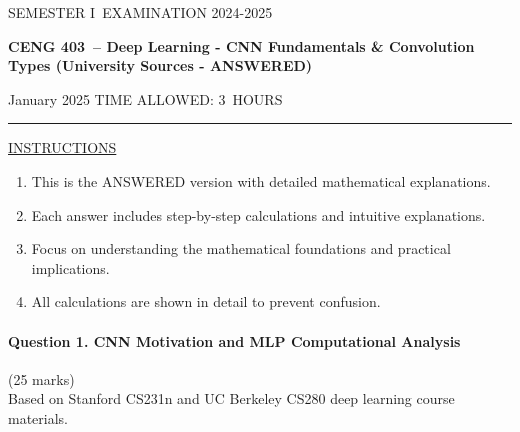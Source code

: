 \documentclass[12pt]{article}
\newcommand{\masunitnumber}{CENG 403}
\newcommand{\examdate}{January 2025}
\newcommand{\academicyear}{2024-2025}
\newcommand{\semester}{I}
\newcommand{\coursename}{Deep Learning - CNN Fundamentals \& Convolution Types (University Sources - ANSWERED)}
\newcommand{\numberofhours}{3}
\begin{document}
\setlength{\headsep}{5truemm}
\setlength{\headheight}{14.5truemm}
\setlength{\voffset}{-0.45truein}
\renewcommand{\headrulewidth}{0.0pt}
\begin{center}
SEMESTER \semester\ EXAMINATION \academicyear
\end{center}
\begin{center}
{\bf \masunitnumber\ -- \coursename}
\end{center}
\vspace{20truemm}
\noindent \examdate\hspace{45truemm} TIME ALLOWED: \numberofhours\ HOURS
\vspace{19truemm}
\hrule
\vspace{19truemm}
\noindent\underline{INSTRUCTIONS}
\vspace{8truemm}
\begin{enumerate}
\item This is the ANSWERED version with detailed mathematical explanations.
\item Each answer includes step-by-step calculations and intuitive explanations.
\item Focus on understanding the mathematical foundations and practical implications.
\item All calculations are shown in detail to prevent confusion.
\end{enumerate}

\newpage
\lhead{}
\rhead{\masunitnumber}
\chead{}
\lfoot{}
\cfoot{\thepage}
\rfoot{}
\setlength{\footskip}{45pt}


\paragraph{Question 1. CNN Motivation and MLP Computational Analysis}{{\hfill (25 marks)}}\\
Based on Stanford CS231n and UC Berkeley CS280 deep learning course materials.
\end{document}
